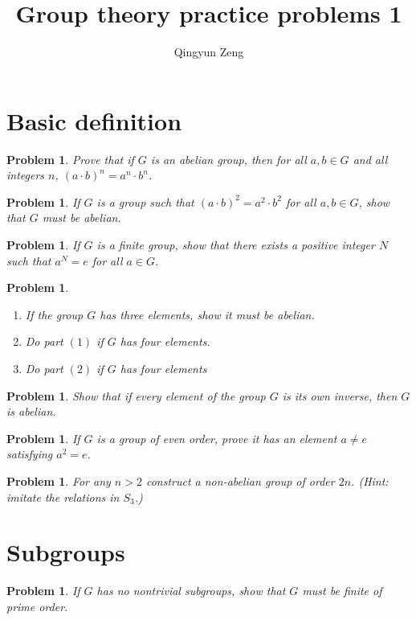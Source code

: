 \documentclass[12pt]{amsart}
\newtheorem{prob}[thm]{Problem}
\theoremstyle{definition}
\theoremstyle{remark}
\numberwithin{equation}{section}
\begin{document}
	\author{Qingyun Zeng}
\title{Group theory practice problems 1}


\maketitle
\tableofcontents	
\section{Basic definition}
\begin{prob}
Prove that if $G$ is an abelian group, then for all $a,b \in G$ and all integers
$n$, $(a\cdot b)^n = a^n\cdot b^n$.
\end{prob}
\begin{prob}
	If $G$ is a group such that $(a\cdot b)^2 = a^2\cdot b^2$ for all $a, b \in G$, show that
	$G$ must be abelian. 
\end{prob}
\begin{prob}
	If $G$ is a finite group, show that there exists a positive integer $N$ such
	that $a^N = e$ for all $a \in G$.
\end{prob}

\begin{prob}
	\begin{enumerate}
		\item If the group $G$ has three elements, show it must be abelian.
		\item Do part $(1)$ if $G$ has four elements.
		\item Do part $(2)$ if $G$ has four elements
	\end{enumerate}
\end{prob}

\begin{prob}
	 Show that if every element of the group $G$ is its own inverse, then $G$ is abelian.
\end{prob}

\begin{prob}
	If $G$ is a group of even order, prove it has an element $a \not= e$ satisfying
	$a^2 =e$. 
\end{prob}

\begin{prob}
	For any $n > 2$ construct a non-abelian group of order $2n$. (Hint:
	imitate the relations in $S_3$.)
\end{prob}

\section{Subgroups}
\begin{prob}
	If $G$ has no nontrivial subgroups, show that $G$ must be finite of
	prime order. 
\end{prob}
\end{document}
